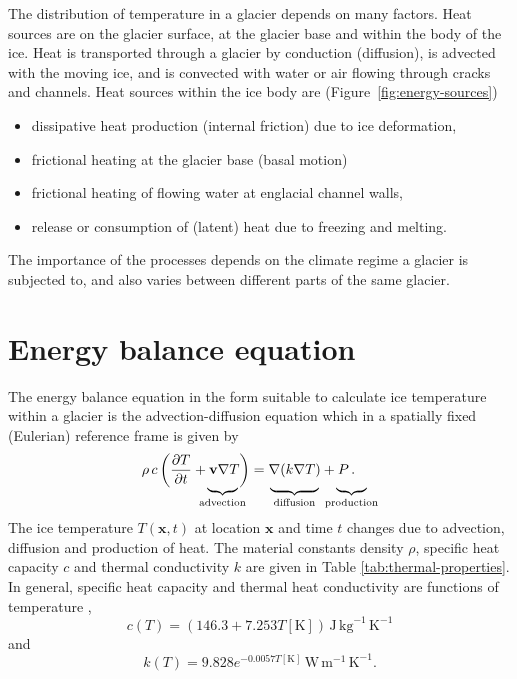 \documentclass[11pt,a4paper,halfparskip]{scrartcl}
\begin{document}
The distribution of temperature in a glacier depends on many factors.  Heat
sources are on the glacier surface, at the glacier base and within the body of
the ice.  Heat is transported through a glacier by conduction (diffusion), is
advected with the moving ice, and is convected with water or air flowing
through cracks and channels.  Heat sources within the ice body are (Figure~\ref{fig:energy-sources})
%
\begin{itemize}\itemsep0ex
\item dissipative heat production (internal friction) due to ice deformation,
\item frictional heating at the glacier base (basal motion)
\item frictional heating of flowing water at englacial channel walls,
\item release or consumption of (latent) heat due to freezing and melting.
\end{itemize}
%
The importance of the processes depends on the climate regime a glacier is
subjected to, and also varies between different parts of the same glacier.


\section{Energy balance equation}
\label{sec:energy-balance}

The energy balance equation in the form suitable to calculate ice temperature
within a glacier is the advection-diffusion equation which in a spatially
fixed (Eulerian) reference frame is given by
%
\begin{align}
 \label{eq:heat-diffusion-advection}
 \rho\, c \left(\frac{\partial T}{\partial t} + \mathbf{v} \nabla T\right) &=
 \nabla(k\nabla T) + P\,.\\[-3ex]
 \underbrace{\rule{5ex}{0ex}}_{\text{advection}} \; & \hspace{3ex}
 \underbrace{\rule{8ex}{0ex}}_{\text{diffusion}} \;
 \underbrace{\rule{5ex}{0ex}}_{\text{production}} \notag
\end{align}
%
The ice temperature $T(\mathbf{x},t)$ at location $\mathbf{x}$ and time $t$
changes due to advection, diffusion and production of heat.  The material
constants density $\rho$, specific heat capacity $c$ and thermal conductivity
$k$ are given in Table \ref{tab:thermal-properties}. In general, specific heat capacity and thermal heat conductivity are functions of temperature \citep[e.g.][]{Ritz1987},
\begin{equation}
  \label{eq:specific-heat}
  c(T) = (146.3 + 7.253  T [\text{K}])\,\text{J}\,\text{kg}^{-1}\,\text{K}^{-1}
\end{equation} and
\begin{equation}
  \label{eq:heat-conductivity}
  k(T) = 9.828 e^{-0.0057 T [\text{K}]}\,\text{W}\,\text{m}^{-1}\,\text{K}^{-1}.
\end{equation}
\end{document}
